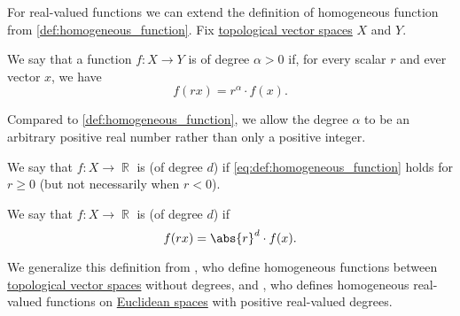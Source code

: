 \begin{definition}\label{def:real_homogeneous_function}\mimprovised
  For real-valued functions we can extend the definition of homogeneous function from \cref{def:homogeneous_function}. Fix \hyperref[def:topological_vector_space]{topological vector spaces} \( X \) and \( Y \).

  We say that a function \( f: X \to Y \) is  of degree \( \alpha > 0 \) if, for every scalar \( r \) and ever vector \( x \), we have
  \begin{equation}\label{eq:def:real_homogeneous_function}
    f(rx) = r^\alpha \cdot f(x).
  \end{equation}

  Compared to \cref{def:homogeneous_function}, we allow the degree \( \alpha \) to be an arbitrary positive real number rather than only a positive integer.

  \begin{thmenum}
     We say that \( f: X \to \BbbR \) is  (of degree \( d \)) if \eqref{eq:def:homogeneous_function} holds for \( r \geq 0 \) (but not necessarily when \( r < 0 \)).

     We say that \( f: X \to \BbbR \) is  (of degree \( d \)) if
    \begin{equation}\label{eq:def:real_homogeneous_function/absolute}
      f(rx) = \abs{r}^d \cdot f(x).
    \end{equation}
  \end{thmenum}
\end{definition}
\begin{comments}
  \item We generalize this definition from , who define homogeneous functions between \hyperref[def:topological_vector_space]{topological vector spaces} without degrees, and , who defines homogeneous real-valued functions on \hyperref[def:euclidean_space]{Euclidean spaces} with positive real-valued degrees.
\end{comments}

